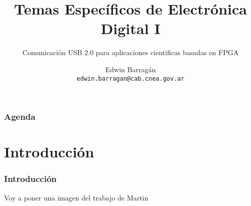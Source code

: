 \documentclass[11pt,a4paper]{beamer}
\author[E. Barragán]{Edwin Barragán\\ \texttt{edwin.barragan@cab.cnea.gov.ar}}
\title{Temas Específicos de Electrónica Digital I}
\subtitle{Comunicación USB 2.0 para aplicaciones cientificas basadas en FPGA}
\institute[UNSJ-FI]{Universidad Nacional de San Juan\\Facultad de Ingeniería}
\begin{document}
	\begin{frame}
		\titlepage
	\end{frame}
	\begin{frame}
		\frametitle{Agenda}
		\tableofcontents[pausesections]
	\end{frame}
	\section{Introducción}
	\begin{frame}
		\frametitle{Introducción}
		Voy a poner una imagen del \alert{trabajo de Martin}
	\end{frame}
\end{document}
